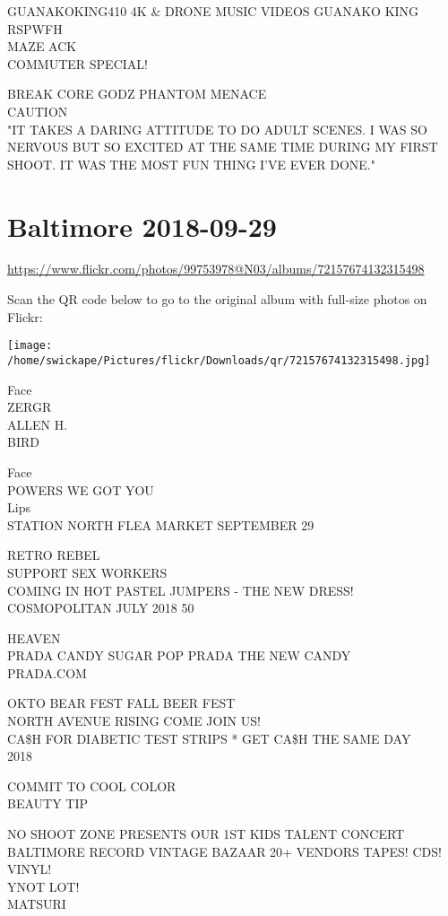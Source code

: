\documentclass[10pt,letterpaper]{article}
\begin{document}
GUANAKOKING410 4K \& DRONE MUSIC VIDEOS GUANAKO KING\\
RSPWFH\\
MAZE ACK\\
COMMUTER SPECIAL!

BREAK CORE GODZ PHANTOM MENACE\\
CAUTION\\
"IT TAKES A DARING ATTITUDE TO DO ADULT SCENES.  I WAS SO NERVOUS BUT SO EXCITED AT THE SAME TIME DURING MY FIRST SHOOT.  IT WAS THE MOST FUN THING I'VE EVER DONE."
\pagebreak

\section*{Baltimore 2018-09-29}

\url{https://www.flickr.com/photos/99753978@N03/albums/72157674132315498}

Scan the QR code below to go to the original album with full-size photos on Flickr:

\texttt{[image: /home/swickape/Pictures/flickr/Downloads/qr/72157674132315498.jpg]}
\pagebreak

Face\\
ZERGR\\
ALLEN H.\\
BIRD

Face\\
POWERS WE GOT YOU\\
Lips\\
STATION NORTH FLEA MARKET SEPTEMBER 29

RETRO REBEL\\
SUPPORT SEX WORKERS\\
COMING IN HOT PASTEL JUMPERS {-} THE NEW DRESS!\\
COSMOPOLITAN JULY 2018 50

HEAVEN\\
PRADA CANDY SUGAR POP PRADA THE NEW CANDY\\
PRADA.COM

OKTO BEAR FEST FALL BEER FEST\\
NORTH AVENUE RISING COME JOIN US!\\
CA\$H FOR DIABETIC TEST STRIPS * GET CA\$H THE SAME DAY\\
2018

COMMIT TO COOL COLOR\\
BEAUTY TIP

NO SHOOT ZONE PRESENTS OUR 1ST KIDS TALENT CONCERT\\
BALTIMORE RECORD VINTAGE BAZAAR 20+ VENDORS TAPES!  CDS!  VINYL!\\
YNOT LOT!\\
MATSURI
\end{document}
